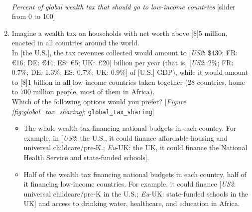 \begin{enumerate}[resume]
  \\ \textit{Percent of global wealth tax that should go to low-income countries} [slider from 0 to 100]
  \item  \label{q:global_tax_sharing} Imagine a wealth tax on households with net worth above [\$]5 million, enacted in all countries around the world.  \\
  In [the U.S.], the tax revenues collected would amount to [\textit{US2}: \$430; FR: \euro{}16; DE: \euro{}44; ES: \euro{}5; UK: £20] billion per year (that is, [\textit{US2}: 2\%; FR: 0.7\%; DE: 1.3\%; ES: 0.7\%; UK: 0.9\%] of [U.S.] GDP), while it would amount to [\$]1 billion in all low-income countries taken together (28 countries, home to 700 million people, most of them in Africa).  \\ Which of the following options would you prefer?  [\textit{Figure \ref{fig:global_tax_sharing}}; \verb|global_tax_sharing|]
  \begin{itemize}
    \item The whole wealth tax financing national budgets in each country. For example, in [\textit{US2}: the U.S., it could finance affordable housing and universal childcare/pre-K.; \textit{Eu}-UK: the UK, it could finance the National Health Service and state-funded schools].
    \item Half of the wealth tax financing national budgets in each country, half of it financing low-income countries. For example, it could finance [\textit{US2}: universal childcare/pre-K in the U.S.; \textit{Eu}-UK: state-funded schools in the UK] and access to drinking water, healthcare, and education in Africa. 
  \end{itemize}
\end{enumerate}


